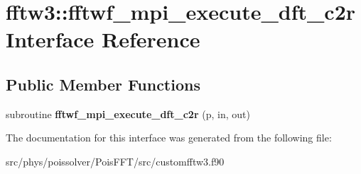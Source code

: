 \hypertarget{interfacefftw3_1_1fftwf__mpi__execute__dft__c2r}{}\section{fftw3\+:\+:fftwf\+\_\+mpi\+\_\+execute\+\_\+dft\+\_\+c2r Interface Reference}
\label{interfacefftw3_1_1fftwf__mpi__execute__dft__c2r}
\subsection*{Public Member Functions}
\begin{DoxyCompactItemize}
\item 
subroutine {\bfseries fftwf\+\_\+mpi\+\_\+execute\+\_\+dft\+\_\+c2r} (p, in, out)\hypertarget{interfacefftw3_1_1fftwf__mpi__execute__dft__c2r_a94c86dc8fa7eb0b2e884a72914691eb0}{}\label{interfacefftw3_1_1fftwf__mpi__execute__dft__c2r_a94c86dc8fa7eb0b2e884a72914691eb0}

\end{DoxyCompactItemize}


The documentation for this interface was generated from the following file\+:\begin{DoxyCompactItemize}
\item 
src/phys/poissolver/\+Pois\+F\+F\+T/src/customfftw3.\+f90\end{DoxyCompactItemize}
